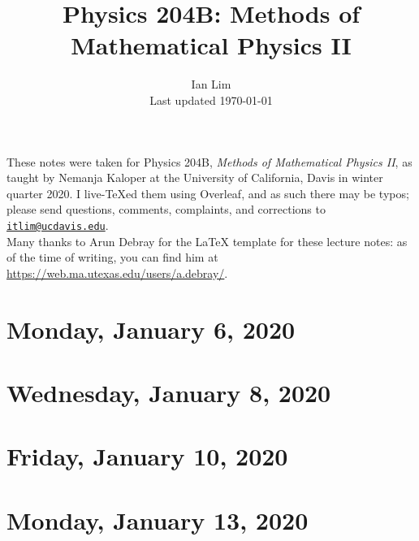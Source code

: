 \documentclass{../mynotes}
\begin{document}
\title{Physics 204B: Methods of Mathematical Physics II}
\author{Ian Lim\\ Last updated \today}
\maketitle
{\small\noindent These notes were taken for Physics 204B, \emph{Methods of Mathematical Physics II}, as taught by Nemanja Kaloper at the University of California, Davis in winter quarter 2020. I live-\TeX ed them using Overleaf, and as such there may be typos; please send questions, comments, complaints, and corrections to 
\href{mailto:itlim@ucdavis.edu?subject=204B\%20Lecture\%20Notes}{\texttt{itlim@ucdavis.edu}}.\\
Many thanks to Arun Debray for the {\LaTeX} template for these lecture notes: as of the time of writing, you can find him at \url{https://web.ma.utexas.edu/users/a.debray/}.}

\tableofcontents

\section{Monday, January 6, 2020}
	
\section{Wednesday, January 8, 2020}
    
\section{Friday, January 10, 2020}
    

\section{Monday, January 13, 2020}
	
%     
%     

%     
%     
\end{document}
